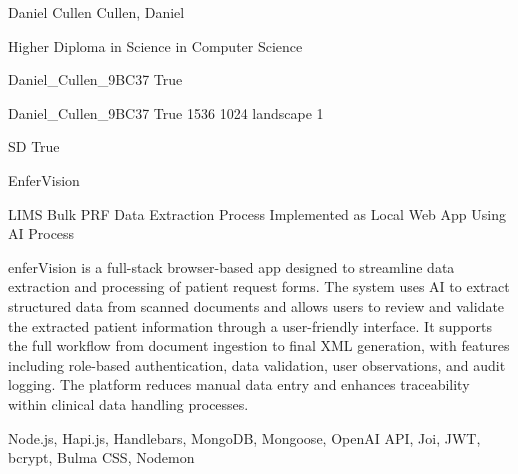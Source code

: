 
\begingroup{}\relax



\def\Key{Daniel_Cullen_9BC37}

{Daniel Cullen}
{Cullen, Daniel}

{Higher Diploma in Science in Computer Science}

{Daniel_Cullen_9BC37}
{True}

{Daniel_Cullen_9BC37}
{True}
{1536}
{1024}
{landscape}
{1}

{SD}
{True}

{EnferVision}

{LIMS Bulk PRF Data Extraction Process Implemented as Local Web App Using AI Process}

{enferVision is a full-stack browser-based app designed to streamline data extraction and processing of patient request forms. The system uses AI to extract structured data from scanned documents and allows users to review and validate the extracted patient information through a user-friendly interface. It supports the full workflow from document ingestion to final XML generation, with features including role-based authentication, data validation, user observations, and audit logging. The platform reduces manual data entry and enhances traceability within clinical data handling processes.}

{Node.js, Hapi.js, Handlebars, MongoDB, Mongoose, OpenAI API, Joi, JWT, bcrypt, Bulma CSS, Nodemon}

